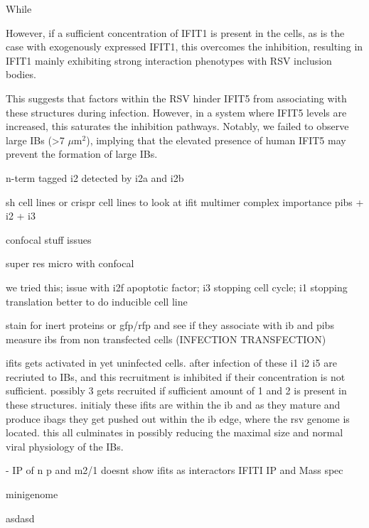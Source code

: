 While




However, if a sufficient concentration of IFIT1 is present in the cells, as is the case with exogenously expressed IFIT1, this overcomes the inhibition, resulting in IFIT1 mainly exhibiting strong interaction phenotypes with RSV inclusion bodies.

This suggests that factors within the RSV hinder IFIT5 from associating with these structures during infection. However, in a system where IFIT5 levels are increased, this saturates the inhibition pathways. Notably, we failed to observe large IBs (>7 \(\mu \mbox{m}^2\)), implying that the elevated presence of human IFIT5 may prevent the formation of large IBs.



n-term tagged i2 detected by i2a and i2b

sh cell lines or crispr cell lines to look at ifit multimer complex importance
pibs + i2 + i3

confocal stuff issues

super res micro with confocal

we tried this; issue with i2f apoptotic factor; i3 stopping cell cycle; i1 stopping translation
better to do inducible cell line

stain for inert proteins or gfp/rfp and see if they associate with ib and pibs
measure ibs from non transfected cells (INFECTION TRANSFECTION)

ifits gets activated in yet uninfected cells. after infection of these i1 i2 i5 are recriuted to IBs, and this recruitment is inhibited if their concentration is not sufficient. possibly 3 gets recruited if sufficient amount of 1 and 2 is present in these structures. initialy these ifits are within the ib and as they mature and produce ibags they get pushed out within the ib edge, where the rsv genome is located. this all culminates in possibly reducing the maximal size and normal viral physiology of the IBs.

\cite{Oliveira2013HumanCells} - IP of n p and m2/1 doesnt show ifits as interactors
IFITI IP and Mass spec

minigenome \cite{Teng2016UseTranscription}


asdasd


